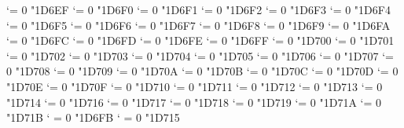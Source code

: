 {  \Umathcode `\Ξ = 0 \normalfam "1D6EF 
  \Umathcode `\Ο = 0 \normalfam "1D6F0 
  \Umathcode `\Π = 0 \normalfam "1D6F1 
  \Umathcode `\Ρ = 0 \normalfam "1D6F2 
  \Umathcode `\ϴ = 0 \normalfam "1D6F3 
  \Umathcode `\Σ = 0 \normalfam "1D6F4 
  \Umathcode `\Τ = 0 \normalfam "1D6F5 
  \Umathcode `\Υ = 0 \normalfam "1D6F6 
  \Umathcode `\Φ = 0 \normalfam "1D6F7 
  \Umathcode `\Χ = 0 \normalfam "1D6F8 
  \Umathcode `\Ψ = 0 \normalfam "1D6F9 
  \Umathcode `\Ω = 0 \normalfam "1D6FA 
  \Umathcode `\α = 0 \normalfam "1D6FC 
  \Umathcode `\β = 0 \normalfam "1D6FD 
  \Umathcode `\γ = 0 \normalfam "1D6FE 
  \Umathcode `\δ = 0 \normalfam "1D6FF 
  \Umathcode `\ε = 0 \normalfam "1D700 
  \Umathcode `\ζ = 0 \normalfam "1D701 
  \Umathcode `\η = 0 \normalfam "1D702 
  \Umathcode `\θ = 0 \normalfam "1D703 
  \Umathcode `\ι = 0 \normalfam "1D704 
  \Umathcode `\κ = 0 \normalfam "1D705 
  \Umathcode `\λ = 0 \normalfam "1D706 
  \Umathcode `\μ = 0 \normalfam "1D707 
  \Umathcode `\ν = 0 \normalfam "1D708 
  \Umathcode `\ξ = 0 \normalfam "1D709 
  \Umathcode `\ο = 0 \normalfam "1D70A 
  \Umathcode `\π = 0 \normalfam "1D70B 
  \Umathcode `\ρ = 0 \normalfam "1D70C 
  \Umathcode `\ς = 0 \normalfam "1D70D 
  \Umathcode `\σ = 0 \normalfam "1D70E 
  \Umathcode `\τ = 0 \normalfam "1D70F 
  \Umathcode `\υ = 0 \normalfam "1D710 
  \Umathcode `\φ = 0 \normalfam "1D711 
  \Umathcode `\χ = 0 \normalfam "1D712 
  \Umathcode `\ψ = 0 \normalfam "1D713 
  \Umathcode `\ω = 0 \normalfam "1D714 
  \Umathcode `\ϵ = 0 \normalfam "1D716 
  \Umathcode `\ϑ = 0 \normalfam "1D717 
  \Umathcode `\ϰ = 0 \normalfam "1D718 
  \Umathcode `\ϕ = 0 \normalfam "1D719 
  \Umathcode `\ϱ = 0 \normalfam "1D71A 
  \Umathcode `\ϖ = 0 \normalfam "1D71B 
  \Umathcode `\∇ = 0 \normalfam "1D6FB 
  \Umathcode `\∂ = 0 \normalfam "1D715 
\tenit}%
